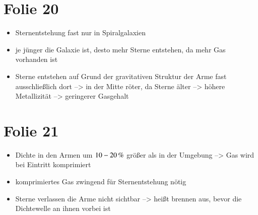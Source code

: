 \section{Folie 20}

\begin{itemize}
\item Sternentstehung fast nur in Spiralgalaxien
\item je jünger die Galaxie ist, desto mehr Sterne entstehen, da mehr Gas vorhanden ist
\item Sterne entstehen auf Grund der gravitativen Struktur der Arme fast ausschließlich dort --> in der Mitte röter, da Sterne älter --> höhere Metallizität --> geringerer Gasgehalt
\end{itemize}


\newpage

\section{Folie 21}

\begin{itemize}
\item Dichte in den Armen um $\unit[10-20]{\%}$ größer als in der Umgebung --> Gas wird bei Eintritt komprimiert
\item komprimiertes Gas zwingend für Sternentstehung nötig
\item Sterne verlassen die Arme nicht sichtbar --> heißt brennen aus, bevor die Dichtewelle an ihnen vorbei ist
\end{itemize}



